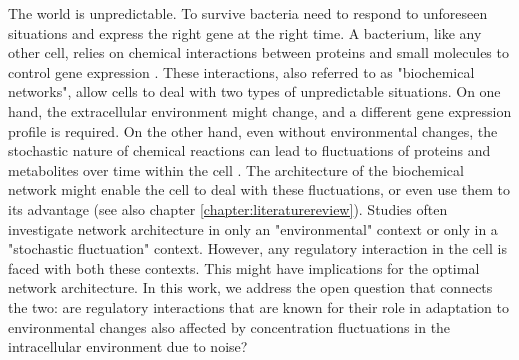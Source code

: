 The world is unpredictable. To survive bacteria need to respond to unforeseen situations and express the right gene at the right time. 
A bacterium, like any other cell, relies on chemical interactions between proteins and small molecules to control gene expression \cite{Bray1995, Alon2006, Alon2007, Tyson2010}.
These interactions, also referred to as "biochemical networks", 
%
allow cells to deal with 
two types of unpredictable situations.
%
On one hand, the extracellular environment might change, and a different gene expression profile is required.
On the other hand,  even without environmental changes, the stochastic nature of chemical reactions can lead to fluctuations of proteins and metabolites over time within the cell \cite{Elowitz2002,Kiviet2014}.
The architecture of the biochemical network might enable the cell to deal with these fluctuations, or even use them to its advantage (see also chapter \ref{chapter:literaturereview}).
%
Studies often investigate network architecture in only an "environmental" context or only in a "stochastic fluctuation" context.
%
However, any regulatory interaction in the cell is faced with both these contexts.
%
This might have implications for the optimal network architecture.
%
In this work, we address the open question that connects the two:
%
are regulatory interactions that are known for their role in adaptation to environmental changes also affected by concentration fluctuations in the intracellular environment due to noise?


